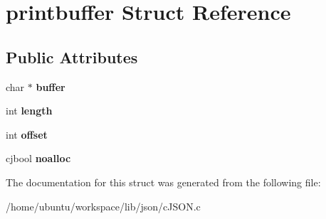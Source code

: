 \hypertarget{structprintbuffer}{\section{printbuffer Struct Reference}
\label{structprintbuffer}
}
\subsection*{Public Attributes}
\begin{DoxyCompactItemize}
\item 
\hypertarget{structprintbuffer_a5176d97bde8869f161c877e52767b350}{char $\ast$ {\bfseries buffer}}\label{structprintbuffer_a5176d97bde8869f161c877e52767b350}

\item 
\hypertarget{structprintbuffer_ae0320ae6fa335d537ce2ad2e09dabf61}{int {\bfseries length}}\label{structprintbuffer_ae0320ae6fa335d537ce2ad2e09dabf61}

\item 
\hypertarget{structprintbuffer_ac1e12f39d1f481112ccdb004235f7760}{int {\bfseries offset}}\label{structprintbuffer_ac1e12f39d1f481112ccdb004235f7760}

\item 
\hypertarget{structprintbuffer_a489f68b0820eb63308e4ced08bb26cbd}{cjbool {\bfseries noalloc}}\label{structprintbuffer_a489f68b0820eb63308e4ced08bb26cbd}

\end{DoxyCompactItemize}


The documentation for this struct was generated from the following file\-:\begin{DoxyCompactItemize}
\item 
/home/ubuntu/workspace/lib/json/c\-J\-S\-O\-N.\-c\end{DoxyCompactItemize}
